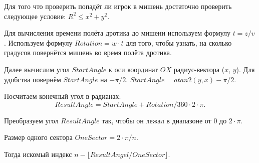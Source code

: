 \solutionSection

Для того что проверить попадёт ли игрок в мишень достаточно проверить следующее условие: $R^2 \le x^2 + y^2$.

Для вычисления времени полёта дротика до мишени используем формулу \linebreak $t = z / v$. Используем формулу $Rotation = w \cdot t$ для того, чтобы узнать, на сколько градусов повернётся мишень во время полёта дротика.

Далее вычислим угол $StartAngle$ к оси координат $OX$  радиус-вектора ($x$, $y$). Для удобства повернём $StartAngle$ на $-\pi/2$. $StartAngle = atan2(y, x) - \pi/2$.

Посчитаем конечный угол в радианах: $$ResultAngle = StartAngle + Rotation / 360 \cdot 2 \cdot \pi.$$

Преобразуем угол $ResultAngle$ так, чтобы он лежал в диапазоне от $0$ до $2 \cdot \pi$.

Размер одного сектора $OneSector = 2 \cdot \pi / n$.

Тогда искомый индекс $n - \lfloor ResultAngel / OneSector \rfloor$. 

\codeExample

